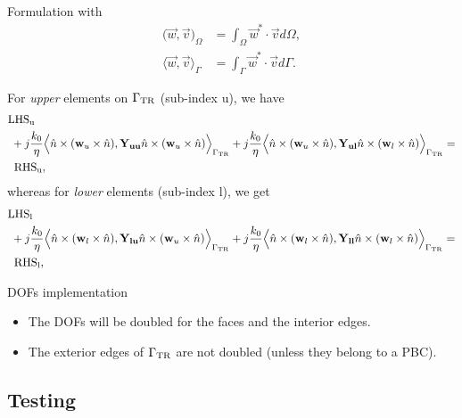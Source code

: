 \begin{frame}[allowframebreaks]{Formulation}
  with
  \begin{align}
    \Big(\vec{w},\vec{v}\Big)_\Omega &= \int_\Omega \vec{w}^* \cdot \vec{v} d\Omega, \nonumber\\
    \Big\langle \vec{w},\vec{v}\Big\rangle_{\Gamma} &= \int_\Gamma \vec{w}^* \cdot \vec{v} d\Gamma.\nonumber
  \end{align}
  
  \framebreak %
  For \emph{upper} elements on $\Gamma_{\rm TR}$ (sub-index u), we have
  \small
  \begin{align*}
    &{\rm LHS_u} \\
    &\; + j\frac{k_0}{\eta}\Big\langle\hat{n}\times(\vec{w}_u\times\hat{n}),\vec{Y_{uu}}\hat{n}\times(\vec{w}_u\times\hat{n})\Big\rangle_{\Gamma_{\text{TR}}} + j\frac{k_0}{\eta}\Big\langle\hat{n}\times(\vec{w}_u\times\hat{n}),\vec{Y_{ul}}\hat{n}\times(\vec{w}_l\times\hat{n})\Big\rangle_{\Gamma_{\text{TR}}} = \\
    &\;\;{\rm RHS_u},
  \end{align*}
  \normalfont
  whereas for \emph{lower} elements (sub-index l), we get
  \small
  \begin{align*}
    &{\rm LHS_l} \\
    &\; + j\frac{k_0}{\eta}\Big\langle\hat{n}\times(\vec{w}_l\times\hat{n}),\vec{Y_{lu}}\hat{n}\times(\vec{w}_u\times\hat{n})\Big\rangle_{\Gamma_{\text{TR}}} + j\frac{k_0}{\eta}\Big\langle\hat{n}\times(\vec{w}_l\times\hat{n}),\vec{Y_{ll}}\hat{n}\times(\vec{w}_l\times\hat{n})\Big\rangle_{\Gamma_{\text{TR}}} = \\
    &\;\;{\rm RHS_l},
  \end{align*}
  \normalfont
\end{frame}

\begin{frame}{DOFs implementation}
  \begin{itemize}
    \item The DOFs will be doubled for the faces and the interior edges.
    \item The exterior edges of $\Gamma_{\rm TR}$ are not doubled (unless they belong to a PBC).
  \end{itemize}
\end{frame}

\subsection{Testing}

